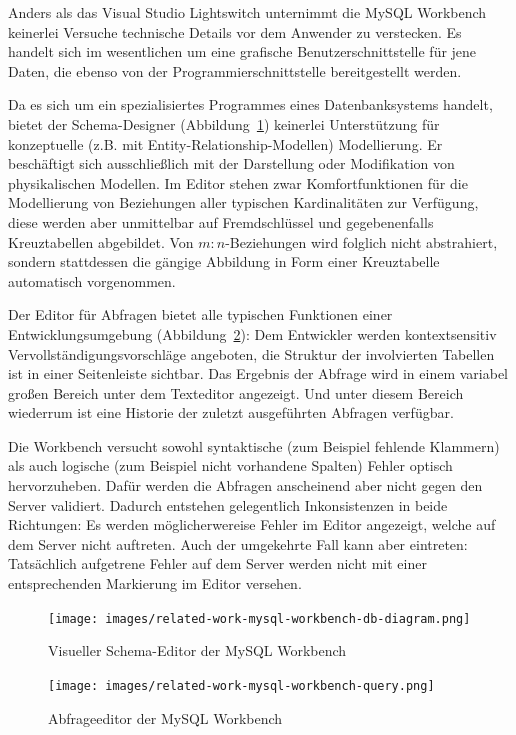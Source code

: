 Anders als das Visual Studio Lightswitch unternimmt die MySQL Workbench keinerlei Versuche technische Details vor dem Anwender zu verstecken. Es handelt sich im wesentlichen um eine grafische Benutzerschnittstelle für jene Daten, die ebenso von der Programmierschnittstelle bereitgestellt werden.

Da es sich um ein spezialisiertes Programmes eines Datenbanksystems handelt, bietet der Schema-Designer (Abbildung~\ref{fig:mysql-workbench-schema-diagram}) keinerlei Unterstützung für konzeptuelle (z.B. mit Entity-Relationship-Modellen) Modellierung. Er beschäftigt sich ausschließlich mit der Darstellung oder Modifikation von physikalischen Modellen. Im Editor stehen zwar Komfortfunktionen für die Modellierung von Beziehungen aller typischen Kardinalitäten zur Verfügung, diese werden aber unmittelbar auf Fremdschlüssel und gegebenenfalls Kreuztabellen abgebildet. Von $m:n$-Beziehungen wird folglich nicht abstrahiert, sondern stattdessen die gängige Abbildung in Form einer Kreuztabelle automatisch vorgenommen.

Der Editor für Abfragen bietet alle typischen Funktionen einer Entwicklungsumgebung (Abbildung~\ref{fig:mysql-workbench-query}): Dem Entwickler werden kontextsensitiv Vervollständigungsvorschläge angeboten, die Struktur der involvierten Tabellen ist in einer Seitenleiste sichtbar. Das Ergebnis der Abfrage wird in einem variabel großen Bereich unter dem Texteditor angezeigt. Und unter diesem Bereich wiederrum ist eine Historie der zuletzt ausgeführten Abfragen verfügbar.

Die Workbench versucht sowohl syntaktische (zum Beispiel fehlende Klammern) als auch logische (zum Beispiel nicht vorhandene Spalten) Fehler optisch hervorzuheben. Dafür werden die Abfragen anscheinend aber nicht gegen den Server validiert. Dadurch entstehen gelegentlich Inkonsistenzen in beide Richtungen: Es werden möglicherwereise Fehler im Editor angezeigt, welche auf dem Server nicht auftreten. Auch der umgekehrte Fall kann aber eintreten: Tatsächlich aufgetrene Fehler auf dem Server werden nicht mit einer entsprechenden Markierung im Editor versehen.

\begin{figure}[p]
  \centering \texttt{[image: images/related-work-mysql-workbench-db-diagram.png]}
  \caption{Visueller Schema-Editor der MySQL Workbench}
  \label{fig:mysql-workbench-schema-diagram}
\end{figure}

\begin{figure}[p]
  \centering \texttt{[image: images/related-work-mysql-workbench-query.png]}
  \caption{Abfrageeditor der MySQL Workbench}
  \label{fig:mysql-workbench-query}
\end{figure}

